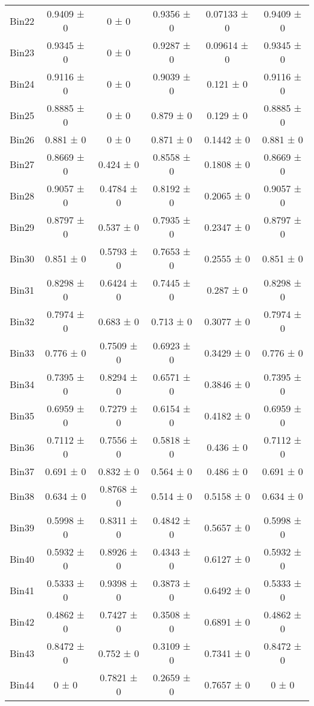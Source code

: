 \begin{tabular}{@{\extracolsep{4pt}}lccccc@{}}
     Bin22 & 0.9409 ± 0 & 0 ± 0 & 0.9356 ± 0 & 0.07133 ± 0 & 0.9409 ± 0 \\ 
     Bin23 & 0.9345 ± 0 & 0 ± 0 & 0.9287 ± 0 & 0.09614 ± 0 & 0.9345 ± 0 \\ 
     Bin24 & 0.9116 ± 0 & 0 ± 0 & 0.9039 ± 0 & 0.121 ± 0 & 0.9116 ± 0 \\ 
     Bin25 & 0.8885 ± 0 & 0 ± 0 & 0.879 ± 0 & 0.129 ± 0 & 0.8885 ± 0 \\ 
     Bin26 & 0.881 ± 0 & 0 ± 0 & 0.871 ± 0 & 0.1442 ± 0 & 0.881 ± 0 \\ 
     Bin27 & 0.8669 ± 0 & 0.424 ± 0 & 0.8558 ± 0 & 0.1808 ± 0 & 0.8669 ± 0 \\ 
     Bin28 & 0.9057 ± 0 & 0.4784 ± 0 & 0.8192 ± 0 & 0.2065 ± 0 & 0.9057 ± 0 \\ 
     Bin29 & 0.8797 ± 0 & 0.537 ± 0 & 0.7935 ± 0 & 0.2347 ± 0 & 0.8797 ± 0 \\ 
     Bin30 & 0.851 ± 0 & 0.5793 ± 0 & 0.7653 ± 0 & 0.2555 ± 0 & 0.851 ± 0 \\ 
     Bin31 & 0.8298 ± 0 & 0.6424 ± 0 & 0.7445 ± 0 & 0.287 ± 0 & 0.8298 ± 0 \\ 
     Bin32 & 0.7974 ± 0 & 0.683 ± 0 & 0.713 ± 0 & 0.3077 ± 0 & 0.7974 ± 0 \\ 
     Bin33 & 0.776 ± 0 & 0.7509 ± 0 & 0.6923 ± 0 & 0.3429 ± 0 & 0.776 ± 0 \\ 
     Bin34 & 0.7395 ± 0 & 0.8294 ± 0 & 0.6571 ± 0 & 0.3846 ± 0 & 0.7395 ± 0 \\ 
     Bin35 & 0.6959 ± 0 & 0.7279 ± 0 & 0.6154 ± 0 & 0.4182 ± 0 & 0.6959 ± 0 \\ 
     Bin36 & 0.7112 ± 0 & 0.7556 ± 0 & 0.5818 ± 0 & 0.436 ± 0 & 0.7112 ± 0 \\ 
     Bin37 & 0.691 ± 0 & 0.832 ± 0 & 0.564 ± 0 & 0.486 ± 0 & 0.691 ± 0 \\ 
     Bin38 & 0.634 ± 0 & 0.8768 ± 0 & 0.514 ± 0 & 0.5158 ± 0 & 0.634 ± 0 \\ 
     Bin39 & 0.5998 ± 0 & 0.8311 ± 0 & 0.4842 ± 0 & 0.5657 ± 0 & 0.5998 ± 0 \\ 
     Bin40 & 0.5932 ± 0 & 0.8926 ± 0 & 0.4343 ± 0 & 0.6127 ± 0 & 0.5932 ± 0 \\ 
     Bin41 & 0.5333 ± 0 & 0.9398 ± 0 & 0.3873 ± 0 & 0.6492 ± 0 & 0.5333 ± 0 \\ 
     Bin42 & 0.4862 ± 0 & 0.7427 ± 0 & 0.3508 ± 0 & 0.6891 ± 0 & 0.4862 ± 0 \\ 
     Bin43 & 0.8472 ± 0 & 0.752 ± 0 & 0.3109 ± 0 & 0.7341 ± 0 & 0.8472 ± 0 \\ 
     Bin44 & 0 ± 0 & 0.7821 ± 0 & 0.2659 ± 0 & 0.7657 ± 0 & 0 ± 0 \\ 

\end{tabular}
